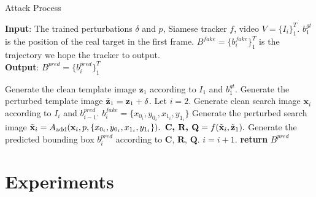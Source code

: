 \documentclass[journal]{IEEEtran}
\begin{document}
\begin{algorithm}[tb]
  \small
  \caption{Attack Process}
  \label{alg:algorithm_attack}
  \textbf{Input}: The trained perturbations $\delta$ and $p$, Siamese tracker $f$, video $V=\{I_i\}_1^T$. $b^{gt}_1$ is the position of the real target in the first frame. $B^{fake}=\{b^{fake}_i\}_1^{T}$ is the trajectory we hope the tracker to output.\\
  \textbf{Output}: $B^{pred}=\{b^{pred}_i\}_1^{T}$
  \begin{algorithmic}[1] %
    \STATE Generate the clean template image $\textbf{z}_1$ according to $I_1$ and $b^{gt}_1$.
    \STATE Generate the perturbed template image $\tilde{\textbf z}_1=\textbf z_1+\delta$.
    \STATE Let $i = 2$.
  \STATE Generate clean search image $\textbf{x}_i$ according to $I_i$ and $b^{pred}_{i-1}$.
  \STATE $b^{fake}_i=\{x_{0_i}, y_{0_i}, x_{1_i}, y_{1_i}\}$
  \STATE Generate the perturbed search image $\tilde{\textbf x}_i = A_{\text{add}}(\textbf x_i, p, \{x_{0_i}, y_{0_i}, x_{1_i}, y_{1_i}\}).$
  \STATE $\textbf{C, R, Q} = f(\tilde {\textbf x}_i, \tilde{\textbf z}_1).$
  \STATE Generate the predicted bounding box $b^{pred}_i$ according to $\textbf{C, R, Q}$.
  \STATE $i = i + 1.$
  \ENDWHILE
  \STATE \textbf{return} $B^{pred}$
  \end{algorithmic}
\end{algorithm}

\section{Experiments}
\end{document}
